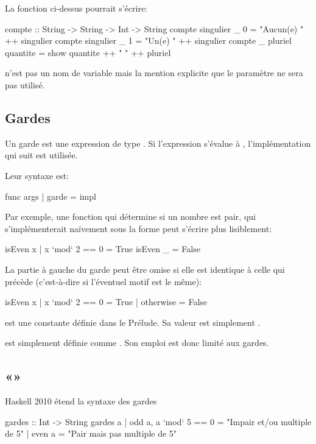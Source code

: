 La fonction  ci-dessus pourrait s'écrire:

\begin{haskellcode}
compte :: String -> String -> Int -> String
compte singulier _ 0 = "Aucun(e) " ++ singulier
compte singulier _ 1 = "Un(e) " ++ singulier
compte _ pluriel quantite = show quantite ++ " " ++  pluriel
\end{haskellcode}

\hs{_} n'est pas un nom de variable mais la mention explicite que le paramètre ne sera pas utilisé.

\subsection{Gardes}
\label{guards}

Un garde est une expression de type . Si l'expression s'évalue à , l'implémentation qui suit est utilisée.

Leur syntaxe est:

\begin{haskellcode}
func args | garde = impl
\end{haskellcode}

Par exemple, une fonction qui détermine si un nombre est pair, qui s'implémenterait naïvement sous la forme  peut s'écrire plus lisiblement:

\begin{haskellcode}
isEven x | x `mod` 2 == 0 = True
isEven _ = False
\end{haskellcode}

La partie à gauche du garde peut être omise si elle est identique à celle qui précède (c'est-à-dire si l'éventuel motif est le même):

\begin{haskellcode}
isEven x | x `mod` 2 == 0 = True
         | otherwise = False
\end{haskellcode}

\begin{infobox}
 est une constante définie dans le Prélude. Sa valeur est simplement .

\begin{warnblock}
 est simplement définie comme . Son emploi est donc limité aux gardes.
\end{warnblock}
\end{infobox}

\subsection{«»}


Haskell 2010 étend la syntaxe des gardes 

\begin{haskellcode}
gardes :: Int -> String
gardes a | odd a, a `mod` 5 == 0 = "Impair et/ou multiple de 5"
         | even a = "Pair mais pas multiple de 5"
\end{haskellcode}

\todo{}
